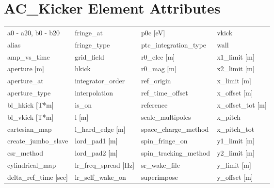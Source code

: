  \section{AC_Kicker Element Attributes}
 \label{s:list.ac.kicker}
 
 \begin{tabular}{llll} \toprule
a0 - a20, b0 - b20             & fringe_at                      & p0c [eV]                       & vkick                          \\
alias                          & fringe_type                    & ptc_integration_type           & wall                           \\
amp_vs_time                    & grid_field                     & r0_elec [m]                    & x1_limit [m]                   \\
aperture [m]                   & hkick                          & r0_mag [m]                     & x2_limit [m]                   \\
aperture_at                    & integrator_order               & ref_origin                     & x_limit [m]                    \\
aperture_type                  & interpolation                  & ref_time_offset                & x_offset [m]                   \\
bl_hkick [T*m]                 & is_on                          & reference                      & x_offset_tot [m]               \\
bl_vkick [T*m]                 & l [m]                          & scale_multipoles               & x_pitch                        \\
cartesian_map                  & l_hard_edge [m]                & space_charge_method            & x_pitch_tot                    \\
create_jumbo_slave             & lord_pad1 [m]                  & spin_fringe_on                 & y1_limit [m]                   \\
csr_method                     & lord_pad2 [m]                  & spin_tracking_method           & y2_limit [m]                   \\
cylindrical_map                & lr_freq_spread [Hz]            & sr_wake_file                   & y_limit [m]                    \\
delta_ref_time [sec]           & lr_self_wake_on                & superimpose                    & y_offset [m]                   \\

\end{tabular}

